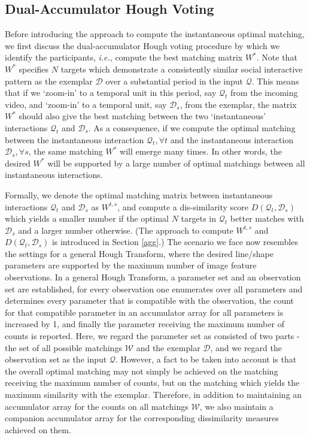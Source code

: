 \documentclass[10pt,twocolumn,letterpaper]{article}
\begin{document}
\subsection{Dual-Accumulator Hough Voting}
\label{vote}

Before introducing the approach to compute the instantaneous optimal matching, we first discuss the dual-accumulator Hough voting procedure by which we identify the participants, \textit{i.e.}, compute the best matching matrix $W^{*}$. Note that  $W^{*}$ specifies $N$ targets which demonstrate a consistently similar social interactive pattern as the exemplar $\mathcal{D}$ over a substantial period in the input $\mathcal{Q}$. This means that if we `zoom-in' to a temporal unit in this period, say $\mathcal{Q}_{t}$ from the incoming video, and `zoom-in' to a temporal unit, say $\mathcal{D}_{s}$, from the exemplar, the matrix $W^{*}$ should also give the best matching between the two `instantaneous' interactions $\mathcal{Q}_{t}$ and $\mathcal{D}_{s}$. As a consequence, if we compute the optimal matching between the instantaneous interaction $\mathcal{Q}_{t}, \forall t$ and the instantaneous interaction $\mathcal{D}_{s}, \forall s$, the same matching $W^{*}$ will emerge many times. In other words, the desired $W^{*}$ will be supported by a large number of  optimal matchings between all instantaneous interactions. 

Formally, we denote the optimal matching matrix between instantaneous interactions $\mathcal{Q}_{t}$ and $\mathcal{D}_{s}$ as $W^{t,s}$, and compute a dis-similarity score $D(\mathcal{Q}_{t}, \mathcal{D}_{s})$ which yields a smaller number if the optimal $N$ targets in $\mathcal{Q}_{t}$ better matches with $\mathcal{D}_{s}$ and a larger number otherwise. (The approach to compute $W^{t,s}$ and $D(\mathcal{Q}_{t}, \mathcal{D}_{s})$ is introduced in Section \ref{agg}.) The scenario we face now resembles the settings for a general Hough Transform, where the desired line/shape parameters are supported by the maximum number of image feature observations. In a general Hough Transform, a parameter set and an observation set are established, for every observation one enumerates over all parameters and determines every parameter that is compatible with the observation, the count for that compatible parameter in an accumulator array for all parameters is increased by 1, and finally the parameter receiving the maximum number of counts is reported. Here, we regard the parameter set as consisted of two parts - the set of all possible matchings $\mathcal{W}$ and the exemplar $\mathcal{D}$, and we regard the observation set as the input $\mathcal{Q}$. However, a fact to be taken into account is that the overall optimal matching may not simply be achieved on the matching receiving the maximum number of counts, but on the matching which yields the maximum similarity with the exemplar. Therefore, in addition to maintaining an accumulator array for the counts on all matchings $\mathcal{W}$, we also maintain a companion accumulator array for the corresponding dissimilarity measures achieved on them. 
\end{document}
